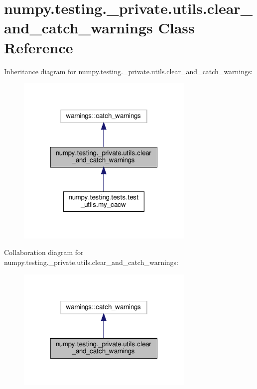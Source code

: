 \hypertarget{classnumpy_1_1testing_1_1__private_1_1utils_1_1clear__and__catch__warnings}{}\section{numpy.\+testing.\+\_\+private.\+utils.\+clear\+\_\+and\+\_\+catch\+\_\+warnings Class Reference}
\label{classnumpy_1_1testing_1_1__private_1_1utils_1_1clear__and__catch__warnings}


Inheritance diagram for numpy.\+testing.\+\_\+private.\+utils.\+clear\+\_\+and\+\_\+catch\+\_\+warnings\+:
\nopagebreak
\begin{figure}[H]
\begin{center}
\leavevmode
\includegraphics[width=241pt]{classnumpy_1_1testing_1_1__private_1_1utils_1_1clear__and__catch__warnings__inherit__graph}
\end{center}
\end{figure}


Collaboration diagram for numpy.\+testing.\+\_\+private.\+utils.\+clear\+\_\+and\+\_\+catch\+\_\+warnings\+:
\nopagebreak
\begin{figure}[H]
\begin{center}
\leavevmode
\includegraphics[width=241pt]{classnumpy_1_1testing_1_1__private_1_1utils_1_1clear__and__catch__warnings__coll__graph}
\end{center}
\end{figure}
